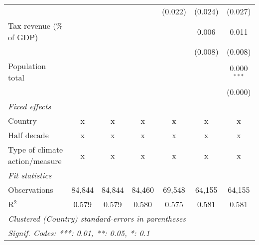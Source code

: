 \begin{tabular}{lcccccc}
                                                             &         &               &               & (0.022)       & (0.024)       & (0.027)\\   
   Tax revenue (\% of GDP)                                   &         &               &               &               & 0.006         & 0.011\\   
                                                             &         &               &               &               & (0.008)       & (0.008)\\   
   Population total                                          &         &               &               &               &               & 0.000$^{***}$\\   
                                                             &         &               &               &               &               & (0.000)\\   
   \emph{Fixed effects}\\
   Country                                                   & x       & x             & x             & x             & x             & x\\  
   Half decade                                               & x       & x             & x             & x             & x             & x\\  
   Type of climate action/measure                            & x       & x             & x             & x             & x             & x\\  
   \midrule \emph{Fit statistics}\\
   Observations                                              & 84,844  & 84,844        & 84,460        & 69,548        & 64,155        & 64,155\\  
   R$^2$                                                     & 0.579   & 0.579         & 0.580         & 0.575         & 0.581         & 0.581\\  
   \midrule
   \multicolumn{7}{l}{\emph{Clustered (Country) standard-errors in parentheses}}\\
   \multicolumn{7}{l}{\emph{Signif. Codes: ***: 0.01, **: 0.05, *: 0.1}}\\
\end{tabular}
\par\endgroup



